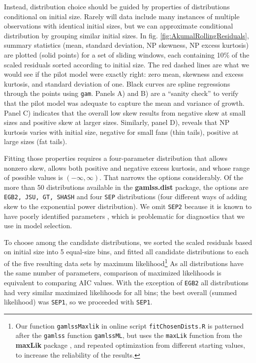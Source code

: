 \documentclass[11pt]{article}
\begin{document}
{Instead, distribution choice should be guided by properties of distributions conditional on initial size. 
Rarely will data include many instances of multiple observations with identical initial sizes, but we can 
approximate conditional distribution by grouping similar initial sizes. 
In fig. \ref{fig:AkumalRollingResiduals}, summary statistics (mean, standard deviation, NP skewness, NP excess kurtosis) 
are plotted (solid points) for a set of sliding windows, each containing 10\% of the scaled residuals sorted according to initial size. 
The red dashed lines are what we would see if the pilot model were exactly right: zero mean, skewness and excess kurtosis, and standard deviation of one. 
Black curves are spline regressions through the points using \texttt{gam}. Panels A) and B) are a ``sanity check'' to verify
that the pilot model was adequate to capture the mean and variance of growth. Panel C) indicates that the overall low skew results from negative
skew at small sizes and positive skew at larger sizes. Similarly, panel D), reveals that NP kurtosis varies with initial size, 
negative for small fans (thin tails), positive at large sizes (fat tails). 

Fitting those properties requires a four-parameter distribution that allows nonzero skew, allows both 
positive and negative excess kurtosis, and whose range of possible values is $(-\infty, \infty)$. That narrows the options considerably. 
Of the more than 50 distributions available in the \textbf{gamlss.dist} package, the options are 
\texttt{EGB2, JSU, GT, SHASH} and four \texttt{SEP} distributions (four different ways of adding skew to the
exponential power distribution). We omit \texttt{SEP2} because it is known to have poorly identified parameters
\citep{diciccio-monti-2004}, which is problematic for diagnostics that we use in model selection. 

To choose among the candidate distributions, we sorted the scaled residuals based on initial size into 5 equal-size bins, 
and fitted all candidate distributions to each of the five resulting data sets by 
maximum likelihood\footnote{Our function \texttt{gamlssMaxlik} in online script \texttt{fitChosenDists.R} is
patterned after the \texttt{gamlss} function \texttt{gamlssML}, but uses the \texttt{maxLik} function from the \textbf{maxLik}
package \citep{maxLik-package}, and repeated optimization from different starting values, to increase the reliability of the results.} 
As all distributions have the same number of parameters, comparison of maximized likelihoods is equivalent to comparing AIC values. 
With the exception of \texttt{EGB2} all distributions had very similar maximized likelihoods for all bins; the best overall (summed
likelihood) was \texttt{SEP1}, so we proceeded with \texttt{SEP1}. 

}
\end{document}
